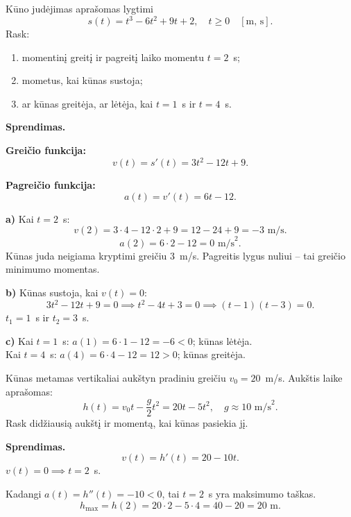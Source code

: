 \begin{example}
Kūno judėjimas aprašomas lygtimi
\[
    s(t) = t^3 - 6t^2 + 9t + 2, \quad t \geq 0 \quad [\text{m, s}].
\]
Rask:
\begin{enumerate}[label=\alph*)]
    \item momentinį greitį ir pagreitį laiko momentu $t = 2$~s;
    \item mometus, kai kūnas sustoja;
    \item ar kūnas greitėja, ar lėtėja, kai $t = 1$~s ir $t = 4$~s.
\end{enumerate}

\textbf{Sprendimas.}

\textbf{Greičio funkcija:}
\[
    v(t) = s'(t) = 3t^2 - 12t + 9.
\]

\textbf{Pagreičio funkcija:}
\[
    a(t) = v'(t) = 6t - 12.
\]

\textbf{a)} Kai $t = 2$~s:
\[
    v(2) = 3 \cdot 4 - 12 \cdot 2 + 9 = 12 - 24 + 9 = -3 \text{ m/s}.
\]
\[
    a(2) = 6 \cdot 2 - 12 = 0 \text{ m/s}^2.
\]
Kūnas juda neigiama kryptimi greičiu $3$~m/s. Pagreitis lygus nuliui --
tai greičio minimumo momentas.

\textbf{b)} Kūnas sustoja, kai $v(t) = 0$:
\[
    3t^2 - 12t + 9 = 0 \implies t^2 - 4t + 3 = 0 \implies (t-1)(t-3) = 0.
\]
$t_1 = 1$~s ir $t_2 = 3$~s.

\textbf{c)} Kai $t = 1$~s: $a(1) = 6 \cdot 1 - 12 = -6 < 0$; kūnas lėtėja.\\
Kai $t = 4$~s: $a(4) = 6 \cdot 4 - 12 = 12 > 0$; kūnas greitėja.
\end{example}

\begin{example}
Kūnas metamas vertikaliai aukštyn pradiniu greičiu $v_0 = 20$~m/s. Aukštis laike
aprašomas:
\[
    h(t) = v_0 t - \frac{g}{2} t^2 = 20t - 5t^2, \quad g \approx 10 \text{ m/s}^2.
\]
Rask didžiausią aukštį ir momentą, kai kūnas pasiekia jį.

\textbf{Sprendimas.}
\[
    v(t) = h'(t) = 20 - 10t.
\]
$v(t) = 0 \implies t = 2$~s.

Kadangi $a(t) = h''(t) = -10 < 0$, tai $t = 2$~s yra maksimumo taškas.
\[
    h_{\max} = h(2) = 20 \cdot 2 - 5 \cdot 4 = 40 - 20 = 20 \text{ m}.
\]
\end{example}